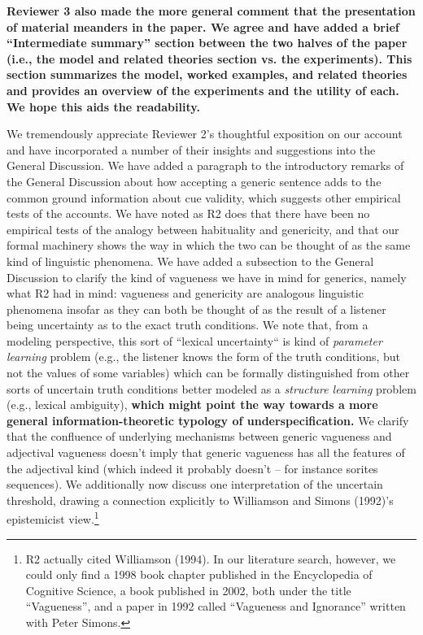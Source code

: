 \documentclass[11pt,letterpaper]{letter} %
\begin{document}
\begin{letter}
\textbf{Reviewer 3 also made the more general comment that the presentation of material meanders in the paper. 
We agree and have added a brief ``Intermediate summary'' section between the two halves of the paper (i.e., the model and related theories section vs. the experiments). 
This section summarizes the model, worked examples, and related theories and provides an overview of the experiments and the utility of each.
We hope this aids the readability.}

We tremendously appreciate Reviewer 2's thoughtful exposition on our account and have incorporated a number of their insights and suggestions into the General Discussion.
We have added a paragraph to the introductory remarks of the General Discussion about how accepting a generic sentence adds to the common ground information about cue validity, which suggests other empirical tests of the accounts.
We have noted as R2 does that there have been no empirical tests of the analogy between habituality and genericity, and that our formal machinery shows the way in which the two can be thought of as the same kind of linguistic phenomena.
We have added a subsection to the General Discussion to clarify the kind of vagueness we have in mind for generics, namely what R2 had in mind: vagueness and genericity are analogous linguistic phenomena insofar as they can both be thought of as the result of a listener being uncertainty as to the exact truth conditions. 
We note that, from a modeling perspective, this sort of ``lexical uncertainty`` is kind of \emph{parameter learning} problem (e.g., the listener knows the form of the truth conditions, but not the values of some variables) which can be formally distinguished from other sorts of uncertain truth conditions better modeled as a \emph{structure learning} problem (e.g., lexical ambiguity), \textbf{which might point the way towards a more general information-theoretic typology of underspecification. }
We clarify that the confluence of underlying mechanisms between generic vagueness and adjectival vagueness doesn't imply that generic vagueness has all the features of the adjectival kind (which indeed it probably doesn't -- for instance sorites sequences).
We additionally now discuss one interpretation of the uncertain threshold, drawing a connection explicitly to Williamson and Simons (1992)'s epistemicist view.\footnote{
	R2 actually cited Williamson (1994). In our literature search, however, we could only find a 1998 book chapter published in the Encyclopedia of Cognitive Science, a book published in 2002, both under the title ``Vagueness'', and a paper in 1992 called ``Vagueness and Ignorance'' written with Peter Simons. 
}


\end{letter}
\end{document}
